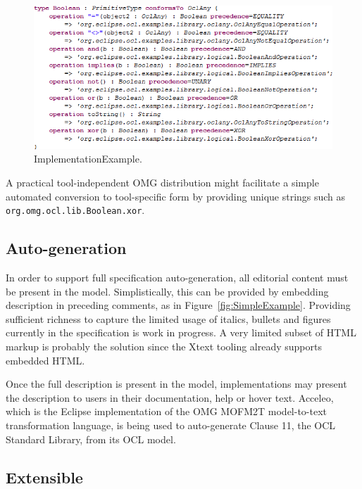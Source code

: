 \documentclass{eceasst}
\begin{document}
\begin{figure}
  \begin{center}
    \includegraphics[width=5.75in]{ImplementationExample.png}
  \end{center}
  \caption{ImplementationExample.}
  \label{fig:ImplementationExample}
\end{figure}

A practical tool-independent OMG distribution might facilitate a simple automated conversion to tool-specific form by providing unique strings such as \verb|org.omg.ocl.lib.Boolean.xor|.

\subsection{Auto-generation}

In order to support full specification auto-generation, all editorial content must be present in the model. Simplistically, this can be provided by embedding description in preceding comments, as in Figure~\ref{fig:SimpleExample}. Providing sufficient richness to capture the limited usage of italics, bullets and figures currently in the specification is work in progress. A very limited subset of HTML markup is probably the solution since the Xtext tooling already supports embedded HTML.

Once the full description is present in the model, implementations may present the description to users in their documentation, help or hover text. Acceleo\cite{M2T/Acceleo}, which is the Eclipse implementation of the OMG MOFM2T\cite{MOFM2T} model-to-text transformation language, is being used to auto-generate Clause 11, the OCL Standard Library, from its OCL model.

\subsection{Extensible}
\end{document}

